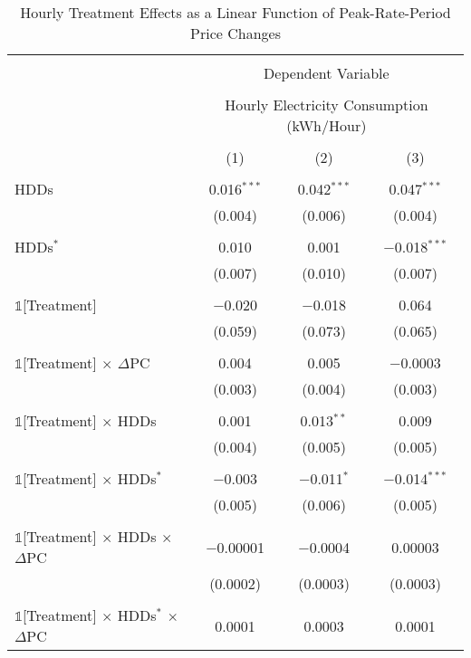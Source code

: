 
\begin{table}[!htbp] \centering 
  \caption{Hourly Treatment Effects as a Linear Function of Peak-Rate-Period Price Changes} 
  \label{Table:Hourly-ATEs-as-a-Linear-Function-of-Peak-Rate-Period-Price-Changes} 
\small 
\begin{tabular}{@{\extracolsep{95pt}}lccc} 
\\[-1.8ex]\hline 
\hline \\[-1.8ex] 
 & \multicolumn{3}{c}{Dependent Variable} \\ 
\cline{2-4} 
\\[-1.8ex] & \multicolumn{3}{c}{Hourly Electricity Consumption  (kWh/Hour)} \\ 
\\[-1.8ex] & (1) & (2) & (3)\\ 
\hline \\[-1.8ex] 
 HDDs & 0.016$^{***}$ & 0.042$^{***}$ & 0.047$^{***}$ \\ 
  & (0.004) & (0.006) & (0.004) \\ 
  & & & \\ 
 HDDs$^{*}$ & 0.010 & 0.001 & $-$0.018$^{***}$ \\ 
  & (0.007) & (0.010) & (0.007) \\ 
  & & & \\ 
 $\mathbb{1}$[Treatment] & $-$0.020 & $-$0.018 & 0.064 \\ 
  & (0.059) & (0.073) & (0.065) \\ 
  & & & \\ 
 $\mathbb{1}$[Treatment] $\times$ $\Delta$PC & 0.004 & 0.005 & $-$0.0003 \\ 
  & (0.003) & (0.004) & (0.003) \\ 
  & & & \\ 
 $\mathbb{1}$[Treatment] $\times$ HDDs & 0.001 & 0.013$^{**}$ & 0.009 \\ 
  & (0.004) & (0.005) & (0.005) \\ 
  & & & \\ 
 $\mathbb{1}$[Treatment] $\times$ HDDs$^{*}$ & $-$0.003 & $-$0.011$^{*}$ & $-$0.014$^{***}$ \\ 
  & (0.005) & (0.006) & (0.005) \\ 
  & & & \\ 
 $\mathbb{1}$[Treatment] $\times$ HDDs $\times$ $\Delta$PC & $-$0.00001 & $-$0.0004 & 0.00003 \\ 
  & (0.0002) & (0.0003) & (0.0003) \\ 
  & & & \\ 
 $\mathbb{1}$[Treatment] $\times$ HDDs$^{*}$ $\times$ $\Delta$PC & 0.0001 & 0.0003 & 0.0001 \\ 

\end{tabular}
\end{table}
